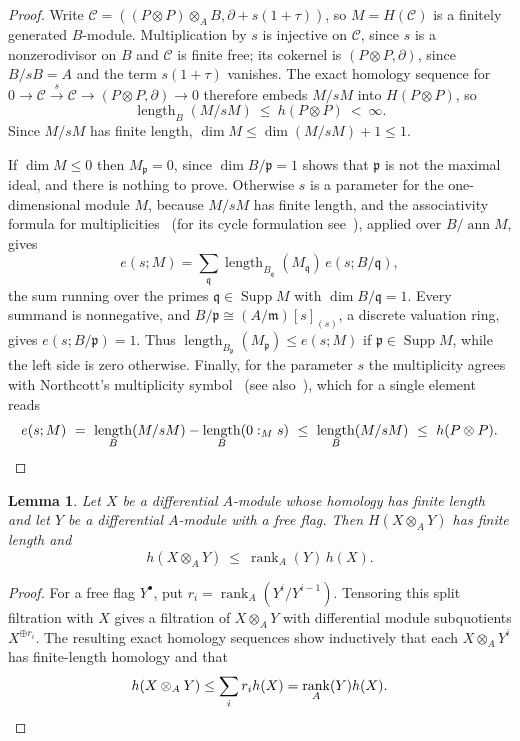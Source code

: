\documentclass[11pt,reqno]{amsart}
\theoremstyle{plain}
\newtheorem{lemma}[theorem]{Lemma}
\theoremstyle{definition}
\DeclareMathOperator{\length}{length}
\DeclareMathOperator{\rank}{rank}
\DeclareMathOperator{\Supp}{Supp}
\newcommand{\htot}{h}
\begin{document}
\begin{proof}
Write $\mathcal C=((P\otimes P)\otimes_AB,\partial+s(1+\tau))$, so $M=H(\mathcal C)$ is a
finitely generated $B$-module.  Multiplication by $s$ is injective on $\mathcal C$, since $s$ is a
nonzerodivisor on $B$ and $\mathcal C$ is finite free; its cokernel is $(P\otimes P,\partial)$,
since $B/sB=A$ and the term $s(1+\tau)$ vanishes.  The exact homology sequence for
$0\to\mathcal C\xrightarrow{s}\mathcal C\to(P\otimes P,\partial)\to0$ therefore embeds $M/sM$ into
$H(P\otimes P)$, so
\[
\length_B(M/sM)\ \le\ \htot(P\otimes P)\ <\ \infty.
\]
Since $M/sM$ has finite length, $\dim M\le\dim(M/sM)+1\le1$.

If $\dim M\le0$ then $M_{\mathfrak p}=0$, since $\dim B/\mathfrak p=1$ shows that $\mathfrak p$ is
not the maximal ideal, and there is nothing to prove.  Otherwise $s$ is a parameter for the
one-dimensional module $M$, because $M/sM$ has finite length, and the associativity formula for
multiplicities~\cite[Corollary~4.7.8]{BrunsHerzog} (for its cycle formulation
see~\cite[Proposition~5.2.11]{Roberts}), applied over $B/\operatorname{ann}M$, gives
\[
e(s;M)=\sum_{\mathfrak q}\length_{B_{\mathfrak q}}(M_{\mathfrak q})\,e(s;B/\mathfrak q),
\]
the sum running over the primes $\mathfrak q\in\Supp M$ with $\dim B/\mathfrak q=1$.  Every summand is
nonnegative, and $B/\mathfrak p\cong(A/\mathfrak m)[s]_{(s)}$, a discrete valuation ring, gives
$e(s;B/\mathfrak p)=1$.  Thus $\length_{B_{\mathfrak p}}(M_{\mathfrak p})\le e(s;M)$ if
$\mathfrak p\in\Supp M$, while the left side is zero otherwise.  Finally, for the parameter $s$ the
multiplicity agrees with
Northcott's multiplicity symbol~\cite[Definition~4.7.3, Theorems~4.7.4 and~4.7.6]{BrunsHerzog}
(see also~\cite[Theorem~5.2.8, Corollary~5.2.9]{Roberts}),
which for a single element reads
\[
e(s;M)\ =\ \length_B(M/sM)-\length_B(0:_Ms)\ \le\ \length_B(M/sM)\ \le\ \htot(P\otimes P).\qedhere
\]
\end{proof}

\begin{lemma}\label{lem:tensorbound}
Let $X$ be a differential $A$-module whose homology has finite length and let $Y$ be a differential
$A$-module with a free flag.  Then $H(X\otimes_AY)$ has finite length and
\[
\htot(X\otimes_AY)\ \le\ \rank_A(Y)\,\htot(X).
\]
\end{lemma}

\begin{proof}
For a free flag $Y^\bullet$, put $r_i=\rank_A(Y^i/Y^{i-1})$.  Tensoring this split filtration with
$X$ gives a filtration of $X\otimes_A Y$ with differential module subquotients $X^{\oplus r_i}$.
The resulting exact homology sequences show inductively that each $X\otimes_A Y^i$ has
finite-length homology and that
\[
\htot(X\otimes_A Y)\le\sum_i r_i\htot(X)=\rank_A(Y)\htot(X).\qedhere
\]
\end{proof}
\end{document}
